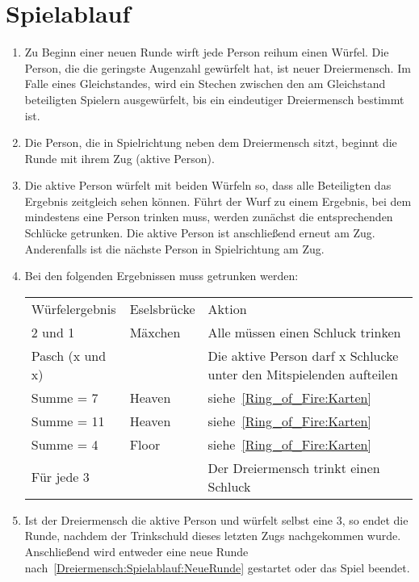\section{Spielablauf}
\begin{enumerate}[label={(\arabic*)}]
	\item\label{Dreiermensch:Spielablauf:NeueRunde}
	Zu Beginn einer neuen Runde wirft jede Person reihum einen Würfel.
	Die Person, die die geringste Augenzahl gewürfelt hat, ist neuer Dreiermensch.
	Im Falle eines Gleichstandes, wird ein Stechen zwischen den am Gleichstand beteiligten Spielern ausgewürfelt, bis ein eindeutiger Dreiermensch bestimmt ist.
	
	\item
	Die Person, die in Spielrichtung neben dem Dreiermensch sitzt, beginnt die Runde mit ihrem Zug (\glqq{}aktive Person\grqq{}).
	
	\item
	Die aktive Person würfelt mit beiden Würfeln so, dass alle Beteiligten das Ergebnis zeitgleich sehen können.
	Führt der Wurf zu einem Ergebnis, bei dem mindestens eine Person trinken muss, werden zunächst die entsprechenden Schlücke getrunken.
	Die aktive Person ist anschließend erneut am Zug.
	Anderenfalls ist die nächste Person in Spielrichtung am Zug.
	
	\item
	Bei den folgenden Ergebnissen muss getrunken werden:

\begin{tabulary}{0.92\textwidth}{llL}
	\toprule
	Würfelergebnis   & Eselsbrücke & Aktion \\
	2 und 1          & Mäxchen & Alle müssen einen Schluck trinken \\
	Pasch (x und x)  &         & Die aktive Person darf x Schlucke unter den Mitspielenden aufteilen \\
	Summe = 7        & Heaven  & siehe~\ref{Ring_of_Fire:Karten} \\ %
	Summe = 11       & Heaven  & siehe~\ref{Ring_of_Fire:Karten} \\
	Summe = 4        & Floor   & siehe~\ref{Ring_of_Fire:Karten} \\
	Für jede 3 &         &Der Dreiermensch trinkt einen Schluck \\\bottomrule
\end{tabulary}

	\item
	Ist der Dreiermensch die aktive Person und würfelt selbst eine 3, so endet die Runde, nachdem der Trinkschuld dieses letzten Zugs nachgekommen wurde.
	Anschließend wird entweder eine neue Runde nach~\ref{Dreiermensch:Spielablauf:NeueRunde} gestartet oder das Spiel beendet.
	

\end{enumerate}
